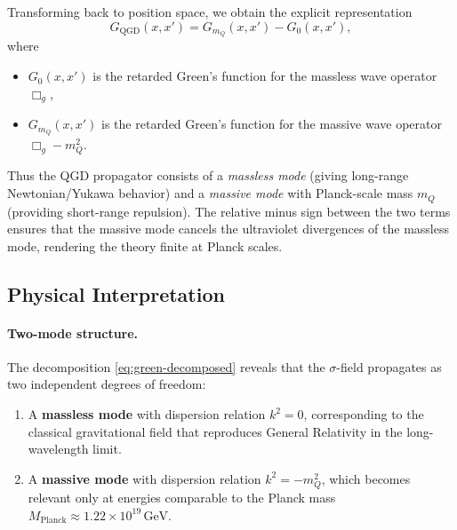 \documentclass[11pt,a4paper]{article}
\theoremstyle{definition}
\theoremstyle{remark}
\begin{document}
	Transforming back to position space, we obtain the explicit representation
	\begin{equation}
		\boxed{\;
			G_{\text{QGD}}(x,x') = G_{m_Q}(x,x') - G_0(x,x'),
			\;}
		\label{eq:green-position}
	\end{equation}
	where
	\begin{itemize}
		\item $G_0(x,x')$ is the retarded Green's function for the massless wave operator $\Box_g$,
		\item $G_{m_Q}(x,x')$ is the retarded Green's function for the massive wave operator $\Box_g - m_Q^2$.
	\end{itemize}
	
	Thus the QGD propagator consists of a \emph{massless mode} (giving long-range Newtonian/Yukawa behavior) and a \emph{massive mode} with Planck-scale mass $m_Q$ (providing short-range repulsion). The relative minus sign between the two terms ensures that the massive mode cancels the ultraviolet divergences of the massless mode, rendering the theory finite at Planck scales.
	
	\subsection{Physical Interpretation}
	
	\paragraph{Two-mode structure.} The decomposition \eqref{eq:green-decomposed} reveals that the $\sigma$-field propagates as two independent degrees of freedom:
	\begin{enumerate}
		\item A \textbf{massless mode} with dispersion relation $k^2 = 0$, corresponding to the classical gravitational field that reproduces General Relativity in the long-wavelength limit.
		\item A \textbf{massive mode} with dispersion relation $k^2 = -m_Q^2$, which becomes relevant only at energies comparable to the Planck mass $M_{\text{Planck}} \approx 1.22\times10^{19}\,\text{GeV}$.
	\end{enumerate}
	
\end{document}
